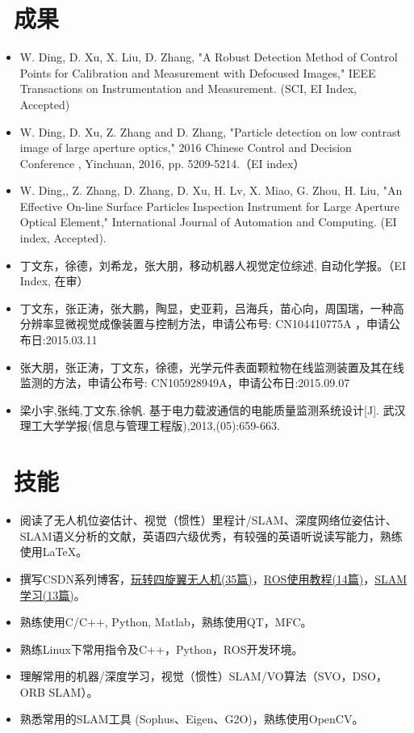 \documentclass{resume}
\begin{document}
\section{\faCogs\ 成果}
\begin{itemize}\small
  \item {\color{red}W. Ding}, D. Xu, X. Liu, D. Zhang, "A Robust Detection Method of Control Points for Calibration and Measurement with Defocused Images," IEEE Transactions on Instrumentation and Measurement. (SCI, EI Index, Accepted)
  \item {\color{red}W. Ding}, D. Xu, Z. Zhang and D. Zhang, "Particle detection on low contrast image of large aperture optics," 2016 Chinese Control and Decision Conference , Yinchuan, 2016, pp. 5209-5214.（EI index）
  \item {\color{red}W. Ding},, Z. Zhang, D. Zhang, D. Xu, H. Lv, X. Miao, G. Zhou, H. Liu, "An Effective On-line Surface Particles Inspection Instrument for Large Aperture Optical Element," International Journal of Automation and Computing. (EI index, Accepted).
  \item {\color{red}丁文东}，徐德，刘希龙，张大朋，移动机器人视觉定位综述, 自动化学报。（EI Index, 在审）
  \item {\color{red}丁文东}，张正涛，张大鹏，陶显，史亚莉，吕海兵，苗心向，周国瑞，一种高分辨率显微视觉成像装置与控制方法，申请公布号: CN104410775A ，申请公布日:2015.03.11
  \item 张大朋，张正涛，{\color{red}丁文东}，徐德，光学元件表面颗粒物在线监测装置及其在线监测的方法，申请公布号: CN105928949A，申请公布日:2015.09.07
  \item 梁小宇,张纯,{\color{red}丁文东},徐帆. 基于电力载波通信的电能质量监测系统设计[J]. 武汉理工大学学报(信息与管理工程版),2013,(05):659-663.
\end{itemize}
\section{\faCogs\ 技能}
\begin{itemize}\small
\item 阅读了无人机位姿估计、视觉（惯性）里程计/SLAM、深度网络位姿估计、SLAM语义分析的文献，英语四六级优秀，有较强的英语听说读写能力，熟练使用LaTeX。
\item 撰写CSDN系列博客，\href{http://blog.csdn.net/wendox/article/category/6026381}{玩转四旋翼无人机(35篇)}，\href{http://blog.csdn.net/wendox/article/category/6390089}{ROS使用教程(14篇)}，\href{http://blog.csdn.net/wendox/article/category/6555599}{SLAM学习(13篇)}。
\item 熟练使用C/C++, Python, Matlab，熟练使用QT，MFC。
\item 熟练Linux下常用指令及C++，Python，ROS开发环境。
\item 理解常用的机器/深度学习，视觉（惯性）SLAM/VO算法（SVO，DSO，ORB SLAM）。
\item 熟悉常用的SLAM工具 (Sophus、Eigen、G2O)，熟练使用OpenCV。
\end{itemize}
\end{document}
